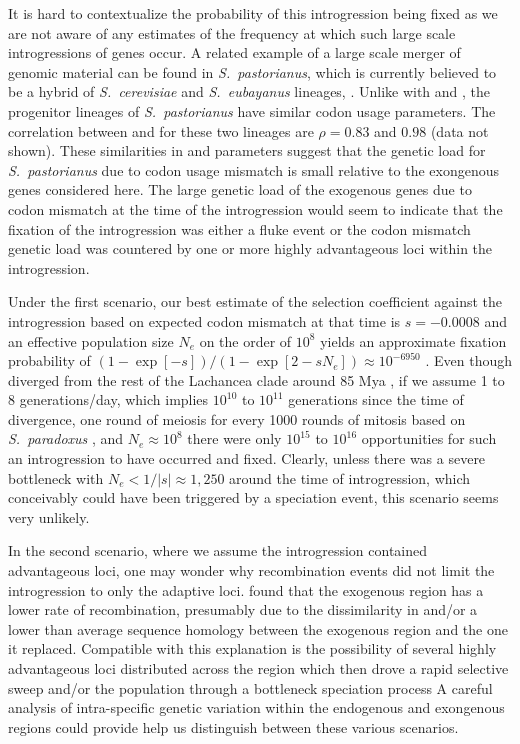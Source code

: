 \documentclass[fleqn,letterpaper]{article}
\begin{document}
It is hard to contextualize the probability of this introgression being fixed as we are not aware of any estimates of the frequency at which such large scale introgressions of genes occur.
A related example of a large scale merger of genomic material can be found in \emph{S.~pastorianus}, which is currently believed to be a hybrid of \emph{S.~cerevisiae} and \emph{S.~eubayanus} lineages, \citep{baker2015}.
Unlike with \kluyveri and \gossypii, the  progenitor lineages of \emph{S.~pastorianus} have similar codon usage parameters.
The correlation between \DM and \DE for these two lineages are  $\rho = 0.83$ and  $0.98$ (data not shown).
These similarities in \DM and \DE parameters suggest that the genetic load for \emph{S.~pastorianus} due to codon usage mismatch is small relative to the exongenous genes considered here. 
The large genetic load of the exogenous genes due to codon mismatch at the time of the introgression would seem to indicate that the fixation of the introgression was either a fluke event or the codon mismatch genetic load was countered by one or more highly advantageous loci within the introgression.

Under the  first scenario, our best estimate of the selection coefficient against the introgression based on expected codon mismatch at that time is $s = -0.0008$ and an effective population size $N_e$ on the order of $10^8$ \citep{wagner2005} yields an approximate fixation probability of $(1-\exp[- s])/(1-\exp[2 - sN_e]) \approx 10^{-6950}$ \citep{SellaAndHirsh2005}.
Even though \kluyveri diverged from the rest of the Lachancea clade around 85 Mya \citep{kensche2008, MHM2015}, if we assume 1 to 8 generations/day, which implies $10^{10}$ to $10^{11}$ generations since the time of divergence, one round of meiosis for every 1000 rounds of mitosis based on \emph{S.~paradoxus} \citep{tsai2008}, and $N_e \approx 10^8$ there were only $10^{15}$ to $10^{16}$ opportunities for such an introgression to have occurred and fixed.
Clearly, unless there was a severe bottleneck with $N_e < 1/|s| \approx 1,250$ around the time of introgression, which conceivably could have been triggered by a speciation event, this scenario seems very unlikely.

In the second scenario, where we assume the introgression contained advantageous loci, one may wonder why recombination events did not limit the introgression to only the adaptive loci.
\citet{payen2009} found that the exogenous region has a lower rate of recombination, presumably due to the dissimilarity in \GC and/or a lower than average sequence homology between the exogenous region and the one it replaced.
Compatible with this explanation is the possibility of several highly advantageous loci distributed across the region which then drove a rapid selective sweep and/or the population through a bottleneck speciation process
A careful analysis of intra-specific genetic variation within the endogenous and exongenous regions could provide help us distinguish between these various scenarios.
\end{document}
